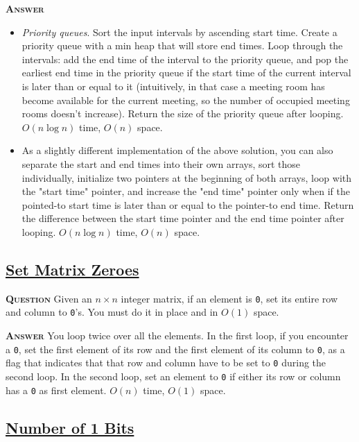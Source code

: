 \documentclass[table, xcdraw]{article}%
\begin{document}
\textsc{\textbf{Answer}}

\begin{itemize}
    \item \textit{Priority queues}. Sort the input intervals by ascending start time. Create a priority queue with a min heap that will store end times. Loop through the intervals: add the end time of the interval to the priority queue, and pop the earliest end time in the priority queue if the start time of the current interval is later than or equal to it (intuitively, in that case a meeting room has become available for the current meeting, so the number of occupied meeting rooms doesn't increase). Return the size of the priority queue after looping. $O(n \log n)$ time, $O(n)$ space.
    \item As a slightly different implementation of the above solution, you can also separate the start and end times into their own arrays, sort those individually, initialize two pointers at the beginning of both arrays, loop with the "start time" pointer, and increase the "end time" pointer only when if the pointed-to start time is later than or equal to the pointer-to end time. Return the difference between the start time pointer and the end time pointer after looping. $O(n \log n)$ time, $O(n)$ space.
\end{itemize}

\subsection{\href{https://leetcode.com/problems/set-matrix-zeroes}{Set Matrix Zeroes}}

\textsc{\textbf{Question}} Given an $n \times n$ integer matrix, if an element is \texttt{0}, set its entire row and column to \texttt{0}'s. You must do it in place and in $O(1)$ space.

\textsc{\textbf{Answer}} You loop twice over all the elements. In the first loop, if you encounter a \texttt{0}, set the first element of its row and the first element of its column to \texttt{0}, as a flag that indicates that that row and column have to be set to \texttt{0} during the second loop. In the second loop, set an element to \texttt{0} if either its row or column has a \texttt{0} as first element. $O(n)$ time, $O(1)$ space.

\subsection{\href{https://leetcode.com/problems/number-of-1-bits}{Number of 1 Bits}}
\end{document}
